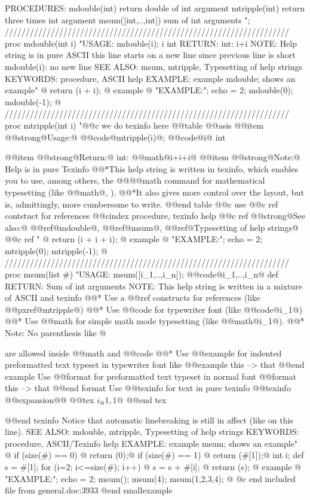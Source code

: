{{{{PROCEDURES:
  mdouble(int)           return double of int argument
  mtripple(int)          return three times int argument
  msum([int,..,int])     sum of int arguments
";
////////////////////////////////////////////////////////////////////
proc mdouble(int i)
"USAGE:    mdouble(i); i int
RETURN:   int: i+i
NOTE:     Help string is in pure ASCII
          this line starts on a new line since previous line is short
          mdouble(i): no new line
SEE ALSO: msum, mtripple, Typesetting of help strings
KEYWORDS: procedure, ASCII help
EXAMPLE:  example mdouble; shows an example"
@{
  return (i + i);
@}
example
@{ "EXAMPLE:"; echo = 2;
  mdouble(0);
  mdouble(-1);
@}
////////////////////////////////////////////////////////////////////
proc mtripple(int i)
"@@c we do texinfo here
@@table @@asis
@@item @@strong@{Usage:@}
@@code@{mtripple(i)@}; @@code@{i@} int

@@item @@strong@{Return:@}
int: @@math@{i+i+i@}
@@item @@strong@{Note:@}
Help is in pure Texinfo
@@*This help string is written in texinfo, which enables you to use,
among others, the @@@@math command for mathematical typesetting (like
@@math@{\alpha, \beta@}).
@@*It also gives more control over the layout, but is, admittingly,
more cumbersome to write.
@@end table
@@c use @@c ref contstuct for references
@@cindex procedure, texinfo help
@@c ref
@@strong@{See also:@}
@@ref@{mdouble@}, @@ref@{msum@}, @@ref@{Typesetting of help strings@}
@@c ref
"
@{
  return (i + i + i);
@}
example
@{ "EXAMPLE:"; echo = 2;
  mtripple(0);
  mtripple(-1);
@}
////////////////////////////////////////////////////////////////////
proc msum(list #)
"USAGE:  msum([i_1,..,i_n]); @@code@{i_1,..,i_n@} def
RETURN:  Sum of int arguments
NOTE:    This help string is written in a mixture of ASCII and texinfo
         @@* Use a @@ref constructs for references (like @@pxref@{mtripple@})
         @@* Use @@code  for typewriter font (like @@code@{i_1@})
         @@* Use @@math  for simple math mode typesetting (like @@math@{i_1@}).
         @@* Note: No parenthesis like @} are allowed inside @@math and @@code
         @@* Use @@example for indented preformatted text typeset in typewriter
         font like
@@example
         this  --> that
@@end example
        Use @@format  for preformatted text typeset in normal font
@@format
         this --> that
@@end format
        Use @@texinfo for text in pure texinfo
@@texinfo
@@expansion@{@}
@@tex
$i_@{1,1@}$
@@end tex

@@end texinfo
        Notice that
        automatic linebreaking         is still in affect (like on this line).
SEE ALSO: mdouble, mtripple, Typesetting of help strings
KEYWORDS: procedure, ASCII/Texinfo help
EXAMPLE: example msum; shows an example"
@{
  if (size(#) == 0) @{ return (0);@}
  if (size(#) == 1) @{ return (#[1]);@}
  int i;
  def s = #[1];
  for (i=2; i<=size(#); i++)
  @{
    s = s + #[i];
  @}
  return (s);
@}
example
@{ "EXAMPLE:"; echo = 2;
  msum();
  msum(4);
  msum(1,2,3,4);
@}
@c end included file from general.doc:3933
@end smallexample

}}}
